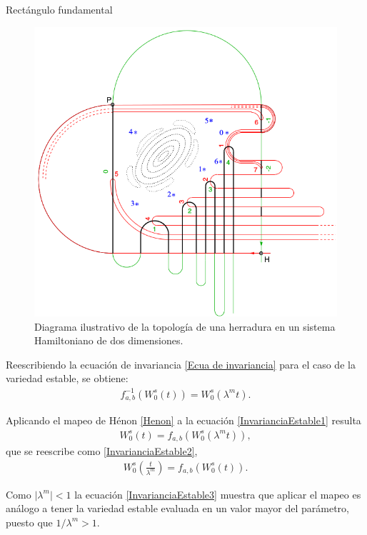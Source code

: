 \documentclass[11pt]{beamer}
\theoremstyle{definition}
\begin{document}
\begin{frame}{Rect\'angulo fundamental}

\begin{figure}
\centering
\includegraphics[scale=0.27]{herradura}
\caption{Diagrama ilustrativo de la topología de una herradura en un sistema Hamiltoniano de dos dimensiones.\cite{Merlo} }
\label{herradura}
\end{figure}

\end{frame}
\begin{frame}
Reescribiendo la ecuación de invariancia \eqref{Ecua de invariancia} para el caso de la variedad estable, se obtiene:
\begin{eqnarray}
f_{a,b}^{-1}(W_{0}^{s}(t))=W_{0}^{s}(\lambda^{m}t).
\label{InvarianciaEstable1}
\end{eqnarray}

Aplicando el mapeo de Hénon  \eqref{Henon} a la ecuación \eqref{InvarianciaEstable1} resulta
\begin{eqnarray}
W_{0}^{s}(t)=f_{a,b}(W_{0}^{s}(\lambda^{m}t)),
\label{InvarianciaEstable2}
\end{eqnarray}
que se reescribe como \eqref{InvarianciaEstable2}, 
\begin{eqnarray}
W_{0}^{s}\left(\frac{t}{\lambda^{m}}\right)=f_{a,b}(W_{0}^{s}(t)).
\label{InvarianciaEstable3}
\end{eqnarray}

Como $\vert \lambda^{m} \vert < 1 $ la ecuación \eqref{InvarianciaEstable3} muestra que aplicar el mapeo es análogo a tener la variedad estable evaluada en un valor mayor del parámetro, puesto que $1/\lambda^{m}>1$. 
\end{frame}
\end{document}
